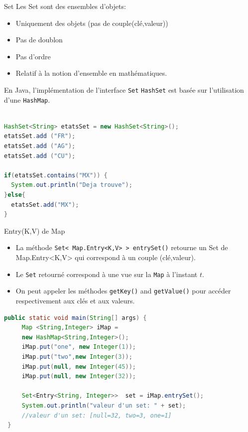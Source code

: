 \documentclass[12pt,a4paper]{beamer}
\begin{document}
\begin{frame}{Set}
Les Set sont des ensembles d'objets:

\begin{itemize}
\item Uniquement des objets (pas de couple(clé,valeur))
\item Pas de doublon
\item Pas d'ordre
\item Relatif à la notion d'ensemble en mathématiques.
\end{itemize}

En Java, l'implémentation de l'interface \texttt{Set} \texttt{HashSet} est basée sur l'utilisation d'une \texttt{HashMap}.

\end{frame}

\begin{frame}[fragile]

\begin{lstlisting}[language=Java]

HashSet<String> etatsSet = new HashSet<String>();
etatsSet.add ("FR");
etatsSet.add ("AG");
etatsSet.add ("CU");
 
if(etatsSet.contains("MX")) {
  System.out.println("Deja trouve");
}else{
  etatsSet.add("MX");
}


\end{lstlisting}
\end{frame}


\begin{frame}{Entry(K,V) de Map}
\begin{itemize}
\item La méthode \texttt{Set< Map.Entry<K,V> > entrySet()} retourne un Set de Map.Entry<K,V> qui correspond à un couple (clé,valeur).
\item Le \texttt{Set} retourné correspond à une vue sur la \texttt{Map} à l'instant $t$.
\item On peut appeler les méthodes \texttt{getKey()} and \texttt{getValue()} pour accéder respectivement aux clés et aux valeurs.
\end{itemize}

\end{frame}

\begin{frame}[fragile]
\begin{lstlisting}[language=Java]
 public static void main(String[] args) {
     Map <String,Integer> iMap = 
     new HashMap<String,Integer>();
     iMap.put("one", new Integer(1));
     iMap.put("two",new Integer(3));
     iMap.put(null, new Integer(45));
     iMap.put(null, new Integer(32));
     
     Set<Entry<String, Integer>>  set = iMap.entrySet();
     System.out.println("valeur d'un set: " + set);
     //valeur d'un set: [null=32, two=3, one=1]
 }
\end{lstlisting}

\end{frame}
\end{document}
